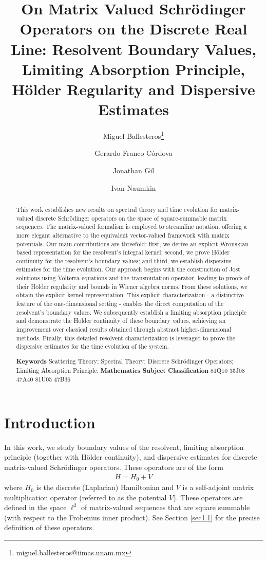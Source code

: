 \documentclass[12pt,oneside,onecolumn,open]{article}
\author[1]{Miguel Ballesteros\footnote{miguel.ballesteros@iimas.unam.mx}}
\author[2]{Gerardo Franco C\'ordova}
\author[1]{Jonathan Gil}
\author[1]{Ivan Naumkin}
\affil[1]{Instituto de Investigaciones en Matem\'aticas Aplicadas y en Sistemas (IIMAS), Universidad Nacional Aut\'onoma de M\'exico (UNAM),  M\'exico.}
\affil[2]{Institute of Analysis and Algebra, Technische Universit\"at Braunschweig,  Germany.}
\title{   On Matrix Valued Schr\"odinger Operators on the Discrete Real Line: Resolvent Boundary Values, Limiting Absorption Principle, H\"older Regularity and Dispersive Estimates      }
\begin{document}



\maketitle

\begin{abstract}

This work establishes new results on spectral theory and time evolution for matrix-valued discrete Schr\"odinger operators on the space of square-summable matrix sequences. The matrix-valued formalism is employed to streamline notation, offering a more elegant alternative to the equivalent vector-valued framework with matrix potentials.
Our main contributions are threefold: first, we derive an explicit Wronskian-based representation for the resolvent's integral kernel; second, we prove H\"older continuity for the resolvent's boundary values; and third, we establish dispersive estimates for the time evolution.
Our approach begins with the construction of Jost solutions using Volterra equations and the transmutation operator, leading to proofs of their H\"older regularity and bounds in Wiener algebra norms. From these solutions, we obtain the explicit kernel representation. This explicit characterization - a distinctive feature of the one-dimensional setting - enables the direct computation of the resolvent's boundary values.
We subsequently establish a limiting absorption principle and demonstrate the H\"older continuity of these boundary values, achieving an improvement over classical results obtained through abstract higher-dimensional methods. Finally, this detailed resolvent characterization is leveraged to prove the dispersive estimates for the time evolution of the system.

\textbf{Keywords} Scattering Theory;  Spectral Theory;  Discrete Schr\"odinger Operators; Limiting Absorption Principle.
 \textbf{Mathematics Subject Classification} 81Q10 35J08 47A40 81U05 47B36

\end{abstract}


   
\section{Introduction}
In this work, we study boundary values of the resolvent, limiting absorption principle (together with H\"older continuity), and dispersive estimates for discrete matrix-valued Schr\"odinger operators. These operators are of the form
\begin{align}
    H = H_0 + V
\end{align}
where \( H_{0} \) is the discrete (Laplacian) Hamiltonian and \( V \) is a self-adjoint matrix multiplication operator (referred to as the potential $V$). These operators are defined in the space $\ell ^{2}$ of matrix-valued sequences that are square summable (with respect to the Frobenius inner product). See Section \ref{sec1.1} for the precise definition of these operators.
\end{document}
